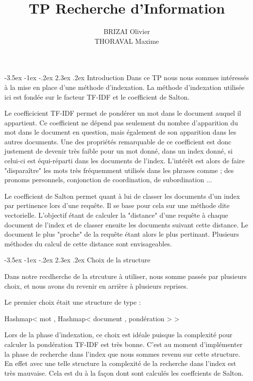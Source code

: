\documentclass[a4paper,12pt]{article}
\makeatletter
\renewcommand\section{\@startsection {section}{1}{\z@}%
                           {-3.5ex \@plus -1ex \@minus -.2ex}%
                           {2.3ex \@plus.2ex}%
                           {\normalfont\Large\bfseries}}
\makeatother
\begin{document}
\newpage
\title{TP Recherche d'Information}
\date{}
\author{BRIZAI Olivier\\THORAVAL Maxime}
\maketitle

\newpage
\section{Introduction}
Dans ce TP nous nous sommes intéressés à la mise en place d'une méthode d'indexation. La méthode d'indexation utilisée ici est fondée sur le facteur TF-IDF et le coefficient de Salton.

Le coefficicient TF-IDF permet de pondérer un mot dans le document auquel il appartient. Ce coefficient ne dépend pas seulement du nombre d'apparition du mot dans le document en question, mais également de
son apparition dans les autres documents. Une des propriétés remarquable de ce coefficient est donc justement de devenir très faible pour un mot donné, dans un index donné, si celui-ci est équi-réparti dans les documents de l'index. L'intérêt est alors de faire "disparaître" les mots très fréquemment utilisés dans les phrases comme ;  des pronoms personnels, conjonction de coordination, de subordination ...

Le coefficient de Salton permet quant à lui de classer les documents d'un index par pertinence lors d'une requête. Il se base pour cela sur une méthode dite vectorielle. L'objectif étant de calculer la "distance" d'une requête à chaque document de l'index et de classer ensuite les documents suivant cette distance. Le document le plus "proche" de la requête étant alors le plus pertinant. Plusieurs méthodes du calcul de cette distance sont envisageables.

\section{Choix de la structure}

Dans notre recdherche de la strcuture à utiliser, nous somme passés par plusieurs choix, et nous avons du revenir en arrière à plusieurs reprises.

Le premier choix était une structure de type : 

Hashmap< mot , Hashmap< document , pondération >  >

Lors de la phase d'indexation, ce choix est idéale puisque la complexité pour calculer la pondération TF-IDF est très bonne.
C'est au moment d'implémenter la phase de recherche dans l'index que nous sommes revenu sur cette structure. En effet avec une telle structure la complexité de la recherche dans l'index est très mauvaise.
Cela est du à la façon dont sont calculés les coeffcients de Salton.
\end{document}

